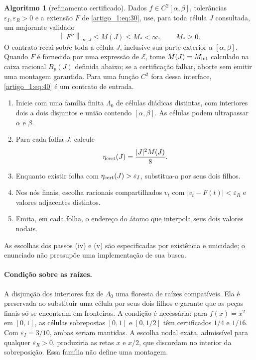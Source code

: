 \documentclass[12pt,a4paper]{article}
\theoremstyle{preciso}
\theoremstyle{definition}
\newtheorem{algoritmo}[teorema]{Algoritmo}
\newcommand{\EE}{\mathcal E}
\newcommand{\normK}[2]{\left\|#1\right\|_{\infty,#2}}
\newcommand{\eqn}[2]{\begin{equation}\label{eq:#1}#2\end{equation}}
\theoremstyle{preciso}
\theoremstyle{preciso}
\theoremstyle{preciso}
\theoremstyle{preciso}
\theoremstyle{definition}
\theoremstyle{preciso}
\theoremstyle{definition}
\theoremstyle{preciso}
\theoremstyle{preciso}
\theoremstyle{definition}
\begin{document}
\begin{algoritmo}[refinamento certificado]\label{map:artigo_1:6.3}
Dados $f\in C^2[\alpha,\beta]$, tolerâncias $\varepsilon_I,\varepsilon_R>0$ e a extensão $F$ de \eqref{artigo_1:eq:30}, use, para toda célula $J$ consultada, um majorante validado
\eqn{40}{\normK{F''}{J}\le M(J)\le M_*<\infty,\qquad M_*\ge0.}
O contrato recai sobre toda a célula $J$, inclusive sua parte exterior a $[\alpha,\beta]$. Quando $F$ é fornecida por uma expressão de $\EE$, tome $M(J)=M_{\rm int}$ calculado na caixa racional $B_p(J)$ definida abaixo; se a certificação falhar, aborte sem emitir uma montagem garantida. Para uma função $C^2$ fora dessa interface, \eqref{artigo_1:eq:40} é um contrato de entrada.
\begin{enumerate}[label=(\roman*),topsep=6pt,itemsep=3pt]
\item Inicie com uma família finita $\Lambda_0$ de células diádicas distintas, com interiores dois a dois disjuntos e união contendo $[\alpha,\beta]$. As células podem ultrapassar $\alpha$ e $\beta$.
\item Para cada folha $J$, calcule
\eqn{41}{\eta_{\rm cert}(J)=\frac{|J|^2M(J)}8.}
\item Enquanto existir folha com $\eta_{\rm cert}(J)>\varepsilon_I$, substitua-a por seus dois filhos.
\item Nos nós finais, escolha racionais compartilhados $v_t$ com $|v_t-F(t)|<\varepsilon_R$ e valores adjacentes distintos.
\item Emita, em cada folha, o endereço do átomo que interpola seus dois valores nodais.
\end{enumerate}
As escolhas dos passos (iv) e (v) são especificadas por existência e unicidade; o enunciado não pressupõe uma implementação de sua busca.

\paragraph{Condição sobre as raízes.}
A disjunção dos interiores faz de $\Lambda_0$ uma floresta de raízes compatíveis. Ela é preservada ao substituir uma célula por seus dois filhos e garante que as peças finais só se encontram em fronteiras. A condição é necessária: para $f(x)=x^2$ em $[0,1]$, as células sobrepostas $[0,1]$ e $[0,1/2]$ têm certificados $1/4$ e $1/16$. Com $\varepsilon_I=3/10$, ambas seriam mantidas. A escolha nodal exata, admissível para qualquer $\varepsilon_R>0$, produziria as retas $x$ e $x/2$, que discordam no interior da sobreposição. Essa família não define uma montagem.
\end{algoritmo}
\end{document}
